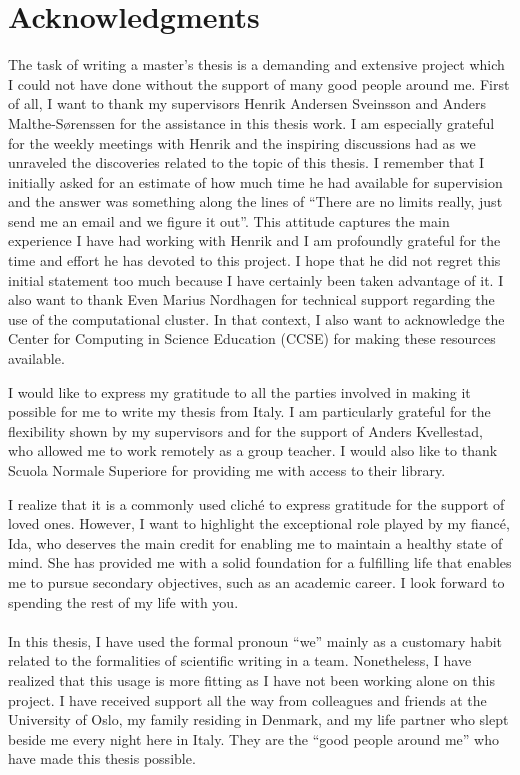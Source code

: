 \chapter*{Acknowledgments}
The task of writing a master's thesis is a demanding and extensive project which I could not have done without the support of many good people around me. First
of all, I want to thank my supervisors Henrik Andersen Sveinsson and Anders
Malthe-Sørenssen for the assistance in this thesis work. I am especially
grateful for the weekly meetings with Henrik and the inspiring discussions
had as we unraveled the discoveries related to the topic of this thesis. I
remember that I initially asked for an estimate of how much time he had
available for supervision and the answer was something along the lines of
``There are no limits really, just send me an email and we figure it out''. This
attitude captures the main experience I have had working with Henrik and I am
profoundly grateful for the time and effort he has devoted to this project. I
hope that he did not regret this initial statement too much because I have
certainly been taken advantage of it. I also want to thank Even Marius Nordhagen
for technical support regarding the use of the computational cluster. In that
context, I also want to acknowledge the Center for Computing in Science
Education (CCSE) for making these resources available. 

I would like to express my gratitude to all the parties involved in making it
possible for me to write my thesis from Italy. I am particularly grateful for
the flexibility shown by my supervisors and for the support of Anders
Kvellestad, who allowed me to work remotely as a group teacher. I would also
like to thank Scuola Normale Superiore for providing me with access to their
library.

I realize that it is a commonly used cliché to express gratitude for the support
of loved ones. However, I want to highlight the exceptional role played by my
fiancé, Ida, who deserves the main credit for enabling me to maintain a healthy
state of mind. She has provided me with a solid foundation for a fulfilling life
that enables me to pursue secondary objectives, such as an academic career. I
look forward to spending the rest of my life with you. \\
\\
In this thesis, I have used the formal pronoun ``we'' mainly as a customary
habit related to the formalities of scientific writing in a team. Nonetheless, I
have realized that this usage is more fitting as I have not been working alone
on this project. I have received support all the way from colleagues and friends
at the University of Oslo, my family residing in Denmark, and my life partner who slept beside me every night here in Italy. They are the ``good people
around me'' who have made this thesis possible.





